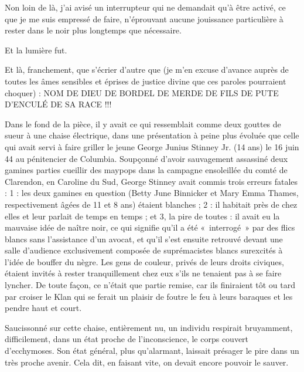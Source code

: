 Non loin de là, j’ai avisé un interrupteur qui ne demandait qu’à être activé, ce que je me suis empressé de faire, n’éprouvant aucune jouissance particulière à rester dans le noir plus longtemps que nécessaire.

Et la lumière fut.

Et là, franchement, que s’écrier d’autre que (je m’en excuse d’avance auprès de toutes les âmes sensibles et éprises de justice divine que ces paroles pourraient choquer) : NOM DE DIEU DE BORDEL DE MERDE DE FILS DE PUTE D’ENCULÉ DE SA RACE !!!

Dans le fond de la pièce, il y avait ce qui ressemblait comme deux gouttes de sueur à une chaise électrique, dans une présentation à peine plus évoluée que celle qui avait servi à faire griller le jeune George Junius Stinney Jr. (14 ans) le 16 juin 44 au pénitencier de Columbia. Soupçonné d’avoir sauvagement assassiné deux gamines parties cueillir des maypops dans la campagne ensoleillée du comté de Clarendon, en Caroline du Sud, George Stinney avait commis trois erreurs fatales : 1 : les deux gamines en question (Betty June Binnicker et Mary Emma Thames, respectivement âgées de 11 et 8 ans) étaient blanches ; 2 : il habitait près de chez elles et leur parlait de temps en temps ; et 3, la pire de toutes : il avait eu la mauvaise idée de naître noir, ce qui signifie qu’il a été «~interrogé~» par des flics blancs sans l’assistance d’un avocat, et qu’il s’est ensuite retrouvé devant une salle d’audience exclusivement composée de suprémacistes blancs surexcités à l’idée de bouffer du nègre. Les gens de couleur, privés de leurs droits civiques, étaient invités à rester tranquillement chez eux s’ils ne tenaient pas à se faire lyncher. De toute façon, ce n’était que partie remise, car ils finiraient tôt ou tard par croiser le Klan qui se ferait un plaisir de foutre le feu à leurs baraques et les pendre haut et court.

Saucissonné sur cette chaise, entièrement nu, un individu respirait bruyamment, difficilement, dans un état proche de l’inconscience, le corps couvert d’ecchymoses. Son état général, plus qu’alarmant, laissait présager le pire dans un très proche avenir. Cela dit, en faisant vite, on devait encore pouvoir le sauver.

